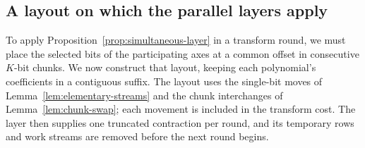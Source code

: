 \subsection{A layout on which the parallel layers apply}

To apply Proposition~\ref{prop:simultaneous-layer} in a transform round,
we must place the selected bits of the participating axes at a common
offset in consecutive $K$-bit chunks. We now construct that layout,
keeping each polynomial's coefficients in a contiguous suffix. The
layout uses the single-bit moves of
Lemma~\ref{lem:elementary-streams} and the chunk interchanges of
Lemma~\ref{lem:chunk-swap}; each movement is included in the transform
cost. The layer then supplies one truncated contraction per round,
and its temporary rows and work streams are removed before the next
round begins.

